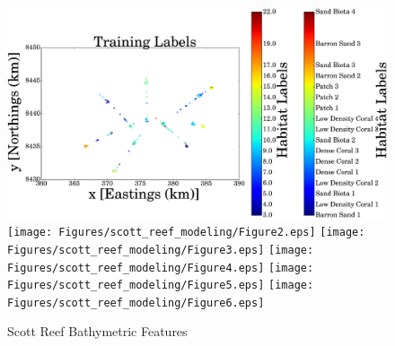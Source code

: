 \documentclass{article}
\begin{document}

	\begin{figure}[!htbp]
	\centering
		\includegraphics[width = 0.32\linewidth]{Figures/scott_reef_modeling/Figure1.eps}
		\texttt{[image: Figures/scott\_reef\_modeling/Figure2.eps]}
		\texttt{[image: Figures/scott\_reef\_modeling/Figure3.eps]}
		\texttt{[image: Figures/scott\_reef\_modeling/Figure4.eps]}
		\texttt{[image: Figures/scott\_reef\_modeling/Figure5.eps]}
		\texttt{[image: Figures/scott\_reef\_modeling/Figure6.eps]}
	\caption{Scott Reef Bathymetric Features}
	\label{Figure:Results:ScottReefBathymetricFeatures}
	\end{figure}
	
\end{document}
